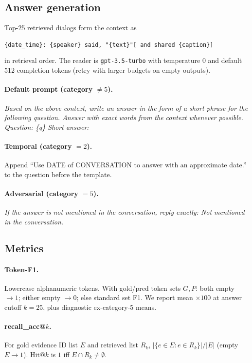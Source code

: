 \documentclass[11pt]{article}
\begin{document}
\subsection{Answer generation}
\label{sec:answer}

Top-25 retrieved dialogs form the context as
\begin{center}
\small\texttt{\{date\_time\}: \{speaker\} said, "\{text\}"[ and shared \{caption\}]}
\end{center}
in retrieval order.
The reader is \texttt{gpt-3.5-turbo} with temperature $0$ and default 512 completion tokens (retry with larger budgets on empty outputs).

\paragraph{Default prompt (category $\neq 5$).}
\textit{Based on the above context, write an answer in the form of a short phrase for the following question. Answer with exact words from the context whenever possible.}\\
\textit{Question: \{q\} Short answer:}

\paragraph{Temporal (category $=2$).}
Append ``Use DATE of CONVERSATION to answer with an approximate date.'' to the question before the template.

\paragraph{Adversarial (category $=5$).}
\textit{If the answer is not mentioned in the conversation, reply exactly: Not mentioned in the conversation.}

\subsection{Metrics}
\label{sec:metrics}

\paragraph{Token-F1.}
Lowercase alphanumeric tokens.
With gold/pred token sets $G,P$: both empty $\rightarrow 1$; either empty $\rightarrow 0$; else standard set F1.
We report mean $\times 100$ at answer cutoff $k{=}25$, plus diagnostic ex-category-5 means.

\paragraph{recall\_acc@$k$.}
For gold evidence ID list $E$ and retrieved list $R_k$,
$\lvert\{e\in E:e\in R_k\}\rvert/\lvert E\rvert$
(empty $E\rightarrow 1$).
Hit@$k$ is $1$ iff $E\cap R_k\neq\emptyset$.
\end{document}
